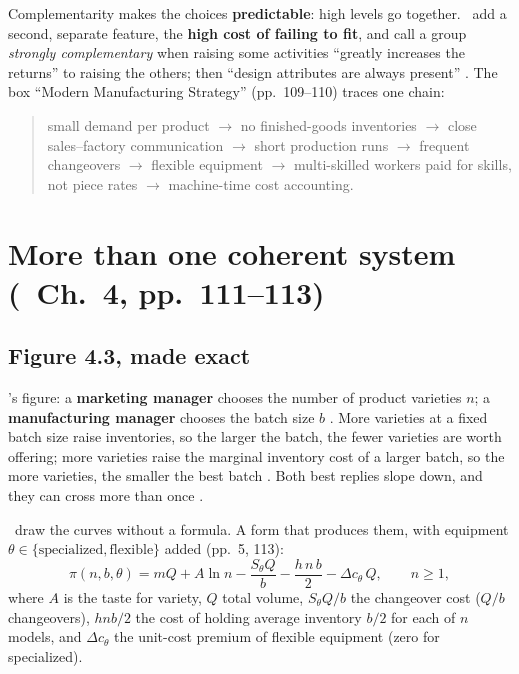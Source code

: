 Complementarity makes the choices \textbf{predictable}: high levels go together. \MR\ add a
second, separate feature, the \textbf{high cost of failing to fit}, and call a group
\emph{strongly complementary} when raising some activities ``greatly increases the returns'' to
raising the others; then ``design attributes are always present'' . The box ``Modern
Manufacturing Strategy'' (pp.~109--110) traces one chain:
\begin{quote}
small demand per product $\to$ no finished-goods inventories $\to$ close sales--factory
communication $\to$ short production runs $\to$ frequent changeovers $\to$ flexible equipment
$\to$ multi-skilled workers paid for skills, not piece rates $\to$ machine-time cost accounting.
\end{quote}

\section{More than one coherent system (\MR\ Ch.~4, pp.~111--113)}\label{sec:a1-systems}

\subsection{Figure 4.3, made exact}\label{sec:a1-fig43}

\MR's figure: a \textbf{marketing manager} chooses the number of product varieties $n$; a
\textbf{manufacturing manager} chooses the batch size $b$ . More varieties at a fixed batch
size raise inventories, so the larger the batch, the fewer varieties are worth offering; more
varieties raise the marginal inventory cost of a larger batch, so the more varieties, the smaller
the best batch . Both best replies slope down, and they can cross more than once .

\MR\ draw the curves without a formula. A form that produces them, with equipment
$\theta \in \{\text{specialized}, \text{flexible}\}$ added (pp.~5, 113):
\[
  \pi(n, b, \theta) = mQ + A \ln n - \frac{S_\theta Q}{b} - \frac{h\, n\, b}{2}
  - \Delta c_\theta\, Q, \qquad n \ge 1,
\]
where $A$ is the taste for variety, $Q$ total volume, $S_\theta Q / b$ the changeover cost ($Q/b$
changeovers), $h n b / 2$ the cost of holding average inventory $b/2$ for each of $n$ models, and
$\Delta c_\theta$ the unit-cost premium of flexible equipment (zero for specialized).

